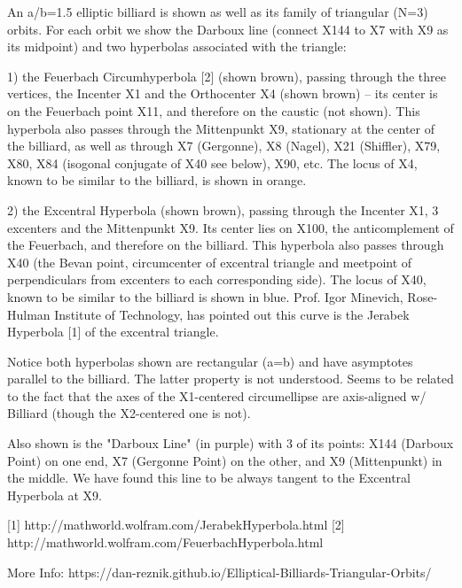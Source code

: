 An a/b=1.5 elliptic billiard is shown as well as its family of triangular (N=3) orbits. For each orbit we show the Darboux line (connect X144 to X7 with X9 as its midpoint) and two hyperbolas associated with the triangle:

1) the Feuerbach Circumhyperbola [2] (shown brown), passing through the three vertices, the Incenter X1 and the Orthocenter X4 (shown brown) -- its center is on the Feuerbach point X11, and therefore on the caustic (not shown). This hyperbola also passes through the Mittenpunkt X9, stationary at the center of the billiard, as well as through  X7 (Gergonne), X8 (Nagel), X21 (Shiffler), X79, X80, X84 (isogonal conjugate of X40 see below), X90, etc. The locus of X4, known to be similar to the billiard, is shown in orange. 

2) the Excentral Hyperbola (shown brown), passing through the Incenter X1, 3 excenters and the Mittenpunkt X9. Its center lies on X100, the anticomplement of the Feuerbach, and therefore on the billiard. This hyperbola also passes through X40 (the Bevan point, circumcenter of excentral triangle and meetpoint of perpendiculars from excenters to each corresponding side). The locus of X40, known to be similar to the billiard is shown in blue. Prof. Igor Minevich, Rose-Hulman Institute of Technology, has pointed out this curve is the Jerabek Hyperbola [1] of the excentral triangle.

Notice both hyperbolas shown are rectangular (a=b) and have asymptotes parallel to the billiard. The latter property is not understood. Seems to be related to the fact that the axes of the X1-centered circumellipse are axis-aligned w/ Billiard (though the X2-centered one is not).

Also shown is the "Darboux Line" (in purple) with 3 of its points: X144 (Darboux Point) on one end, X7 (Gergonne Point) on the other, and X9 (Mittenpunkt) in the middle. We have found this line to be always tangent to the Excentral Hyperbola at X9.

[1] http://mathworld.wolfram.com/JerabekHyperbola.html
[2] http://mathworld.wolfram.com/FeuerbachHyperbola.html

More Info: https://dan-reznik.github.io/Elliptical-Billiards-Triangular-Orbits/
